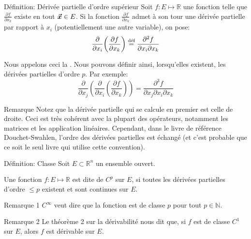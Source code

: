 \documentclass[a4paper]{article}
\begin{document}
\begin{parag}{Définition: Dérivée partielle d'ordre supérieur}
    Soit $f: E \mapsto \mathbb{R}$ une fonction telle que $\frac{\partial f}{\partial x_k}$ existe en tout $\bm{\protect\vec{x}} \in E$. Si la fonction $\frac{\partial f}{\partial x_k}$ admet à son tour une dérivée partielle par rapport à $x_i$ (potentiellement une autre variable), on pose: 
    \[\frac{\partial }{\partial x_i} \left(\frac{\partial f}{\partial x_k}\right) \over{=}{déf} \frac{\partial^2 f}{\partial x_i \partial x_k}\]

    Nous appelons ceci la . Nous pouvons définir ainsi, lorsqu'elles existent, les dérivées partielles d'ordre $p$. Par exemple: 
    \[\frac{\partial}{\partial x_j} \left(\frac{\partial}{\partial x_i} \left(\frac{\partial f}{\partial x_k}\right)\right) = \frac{\partial^3 f}{\partial x_j \partial x_i \partial x_k}\]

    \begin{subparag}{Remarque}
        Notez que la dérivée partielle qui se calcule en premier est celle de droite. Ceci est très cohérent avec la plupart des opérateurs, notamment les matrices et les application linéaires. Cependant, dans le livre de référence Douchet-Swahlen, l'ordre des dérivées partielles est échangé (et c'est probable que ce soit le seul livre qui utilise cette convention). 
    \end{subparag}
\end{parag}

\begin{parag}{Définition: Classe}
    Soit $E \subset \mathbb{R}^n$ un ensemble ouvert.

    Une fonction $f: E \mapsto \mathbb{R}$ est dite de  $C^p$ sur $E$, si toutes les dérivées partielles d'ordre $\leq p$ existent et sont continues sur $E$.
    
    \begin{subparag}{Remarque 1}
        $C^{\infty}$ veut dire que la fonction est de classe $p$ pour tout $p \in \mathbb{N}$.
    \end{subparag}

    \begin{subparag}{Remarque 2}
       Le théorème 2 sur la dérivabilité nous dit que, si $f$ est de classe $C^1$ sur $E$, alors $f$ est dérivable sur $E$.
    \end{subparag}
\end{parag}
\end{document}

